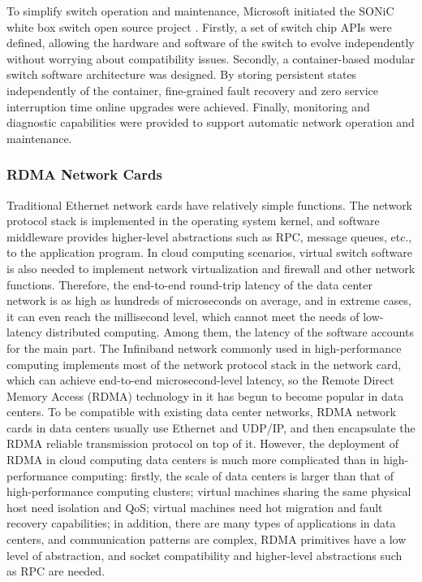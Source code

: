 To simplify switch operation and maintenance, Microsoft initiated the SONiC white box switch open source project \cite{sonic}. Firstly, a set of switch chip APIs were defined, allowing the hardware and software of the switch to evolve independently without worrying about compatibility issues. Secondly, a container-based modular switch software architecture was designed. By storing persistent states independently of the container, fine-grained fault recovery and zero service interruption time online upgrades were achieved. Finally, monitoring and diagnostic capabilities were provided to support automatic network operation and maintenance.

\subsubsection{RDMA Network Cards}

Traditional Ethernet network cards have relatively simple functions. The network protocol stack is implemented in the operating system kernel, and software middleware provides higher-level abstractions such as RPC, message queues, etc., to the application program. In cloud computing scenarios, virtual switch software is also needed to implement network virtualization and firewall and other network functions. Therefore, the end-to-end round-trip latency of the data center network is as high as hundreds of microseconds on average, and in extreme cases, it can even reach the millisecond level, which cannot meet the needs of low-latency distributed computing. Among them, the latency of the software accounts for the main part. The Infiniband \cite{infiniband2000infiniband} network commonly used in high-performance computing implements most of the network protocol stack in the network card, which can achieve end-to-end microsecond-level latency, so the Remote Direct Memory Access (RDMA) technology in it has begun to become popular in data centers. To be compatible with existing data center networks, RDMA network cards in data centers usually use Ethernet and UDP/IP, and then encapsulate the RDMA reliable transmission protocol on top of it. However, the deployment of RDMA in cloud computing data centers is much more complicated than in high-performance computing: firstly, the scale of data centers is larger than that of high-performance computing clusters; virtual machines sharing the same physical host need isolation and QoS; virtual machines need hot migration and fault recovery capabilities; in addition, there are many types of applications in data centers, and communication patterns are complex, RDMA primitives have a low level of abstraction, and socket compatibility and higher-level abstractions such as RPC are needed.

